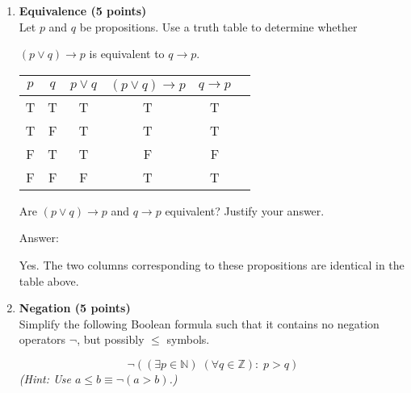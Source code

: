 \documentclass[11pt]{article}
\def\sectionOneA#1{}
\def\sectionOneB#1{}
\def\sectionTwoA#1{}
\def\sectionTwoB#1{}
\def\sectionVicsection#1{#1}
\begin{document}
\begin{enumerate}
\item {\bf Equivalence (5 points)}\\
  Let $p$ and $q$ be propositions. Use a truth table to determine whether
  
  \sectionOneA{$\neg (p\rightarrow q)$ is equivalent to $p\wedge \neg q$.}
  \sectionOneB{$p\wedge \neg q$ is equivalent to $\neg (p\rightarrow q)$.} %
  \sectionTwoA{$\neg (p\rightarrow \neg q)$ is equivalent to $p\wedge q$.}
  \sectionTwoB{$p\wedge q$ is equivalent to $\neg (p\rightarrow \neg q)$.} %
  \sectionVicsection{$(p\vee q) \to p$ is equivalent to $q\to p$.}
  

\begin{center}
{\Large
\begin{tabular}{|c|c|c|c|c|c|}
    $p$ & $q$ & $p\vee q$ & $(p\vee q) \to p$  & $q \to p$ &\hspace*{7cm}\\\hline
T&T& T & T & T&\\
T&F& T & T & T&\\
F&T& T & F & F&\\
F&F& F & T & T&\\
\end{tabular}
}
\end{center}

\vspace*{2ex}
Are  $(p \vee q) \to p$ and $q \to p$ equivalent? Justify your answer.
\vspace*{1cm}

Answer:

Yes. The two columns corresponding to these propositions are identical in the table above.
\vspace*{1cm}

\item {\bf Negation (5 points)}\\

Simplify the following Boolean formula such that it contains
no negation operators $\neg$, but possibly $\leq$ symbols.
%
\sectionOneA{{\Large $$\neg\exists x \;\forall y \;\exists z:\; (x=y\;\wedge\; y=z)$$}}
\sectionOneB{{\Large $$\neg\forall x \;\exists y \;\forall z:\; (x=y\;\wedge\; y=z)$$}} %
\sectionTwoA{{{\Large $$\neg \forall p \;\forall q:\; ((p\vee q)\rightarrow q)$$}} {\em\normalsize (Hint: Use $a\rightarrow b \equiv \neg  a\vee b$)} }
\sectionTwoB{{{\Large $$\neg \exists p \;\exists q:\; ((p\vee q)\rightarrow q)$$}} {\em\normalsize (Hint: Use $a\rightarrow b \equiv \neg  a\vee b$)} } %
\sectionVicsection{{{\Large $$\neg \left((\exists p \in \mathbb{N}) \;(\forall q \in \mathbb{Z}):\; p>q \right) $$}} {\em\normalsize (Hint: Use $a\leq b \equiv \neg(a >b)$.)} 
}
\vspace*{1cm}


\end{enumerate}
\end{document}

